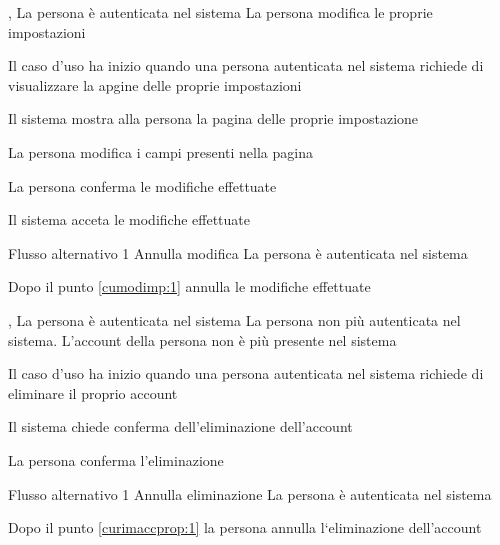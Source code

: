 {, }
{La persona è autenticata nel sistema}
{La persona modifica le proprie impostazioni}
{\begin{enumCU}
	\item Il caso d'uso ha inizio quando una persona autenticata nel sistema richiede di visualizzare la apgine delle proprie impostazioni
	\item Il sistema mostra alla persona la pagina delle proprie impostazione
	\item La persona modifica i campi presenti nella pagina \label{cumodimp:1}
	\item La persona conferma le modifiche effettuate
	\item Il sistema acceta le modifiche effettuate
\end{enumCU}}
%
{Flusso alternativo 1}%
{Annulla modifica}%
{La persona è autenticata nel sistema}%
{\postNulle}%
{\begin{enumCU}
		\item Dopo il punto \ref{cumodimp:1} annulla le modifiche effettuate
	\end{enumCU}}%

\tabcuvspace

{, }
{La persona è autenticata nel sistema}
{La persona non più autenticata nel sistema. L'account della persona non è più presente nel sistema}
{\begin{enumCU}
	\item Il caso d'uso ha inizio quando una persona autenticata nel sistema richiede di eliminare il proprio account
	\item Il sistema chiede conferma dell'eliminazione dell'account \label{curimaccprop:1}
	\item La persona conferma l'eliminazione
\end{enumCU}}
%
{Flusso alternativo 1}%
{Annulla eliminazione}%
{La persona è autenticata nel sistema}%
{\postNulle}%
{\begin{enumCU}
		\item Dopo il punto \ref{curimaccprop:1} la persona annulla l`eliminazione dell'account
	\end{enumCU}}%

\tabcuvspace

